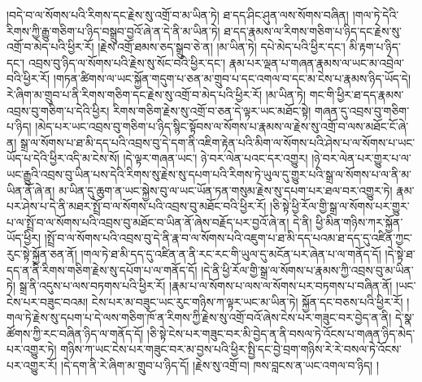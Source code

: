 །བདེ་བ་ལ་སོགས་པའི་རིགས་དང་རྗེས་སུ་འགྲོ་བ་མ་ཡིན་ཏེ། ཐ་དད་ཤིང་ཤུན་ལས་སོགས་བཞིན། །གལ་ཏེ་དེའི་རིགས་ཀྱི་རྒྱུ་གཅིག་པ་ཉིད་བསྒྲུབ་བྱའོ་ཞེ་ན་དེ་ནི་མ་ཡིན་ཏེ། ཐ་དད་རྣམས་ལ་རིགས་གཅིག་པ་ཉིད་དང་རྗེས་སུ་འགྲོ་བ་མེད་པའི་ཕྱིར་རོ། །རྗེས་འགྲོ་ཐམས་ཅད་སྒྲུབ་ཅེ་ན། །མ་ཡིན་ཏེ། དཔེ་མེད་པའི་ཕྱིར་དང་། མི་རྟག་པ་ཉིད་དང་། འབྲས་བུ་ཉིད་ལ་སོགས་པའི་རྗེས་སུ་སོང་བའི་ཕྱིར་དང་། རྣམ་པར་ལྡན་པ་གཞན་རྣམས་ལ་ཡང་མ་འབྲེལ་བའི་ཕྱིར་རོ། །གཏན་ཚིགས་ལ་ཡང་སྐྱོན་གདུག་པ་ཅན་མ་གྲུབ་པ་དང་འགལ་བ་དང་མ་ངེས་པ་རྣམས་ཉིད་ཡོད་དེ། རེ་ཞིག་མ་གྲུབ་པ་ནི་རིགས་གཅིག་དང་རྗེས་སུ་འགྲོ་བ་མེད་པའི་ཕྱིར་རོ། །མ་ཡིན་ཏེ། གང་གི་ཕྱིར་ཐ་དད་རྣམས་འབྲས་བུ་གཅིག་པ་དེའི་ཕྱིར། རིགས་གཅིག་རྗེས་སུ་འགྲོ་བ་ཅན་དེ་ལྟར་ཡང་མཐོང་སྟེ། གཞན་དུ་འབྲས་བུ་གཅིག་པ་ཉིད། །མེད་པར་ཡང་འབྲས་བུ་གཅིག་པ་ཉིད་སྙིང་སྟོབས་ལ་སོགས་པ་རྣམས་ལ་རྗེས་སུ་འགྲོ་བ་ལས་མཐོང་ངོ་ཞེ་ན། སྒྲ་ལ་སོགས་པ་ཐ་མི་དད་པའི་འབྲས་བུ་དེ་དག་ནི་འཇིག་རྟེན་པའི་མིག་ལ་སོགས་པའི་ཤེས་པ་ལ་སོགས་པ་ཡང་ཡོད་པ་དེའི་ཕྱིར་འདི་མ་ངེས་སོ། །དེ་ལྟར་གཞན་ཡང་། ཉེ་བར་ལེན་པའང་དར་འགྱུར། །ཉེ་བར་ལེན་པར་གྱུར་པ་ལ་ཡང་རྒྱུའི་འབྲས་བུ་ཡིན་པས་དེའི་རིགས་སུ་རྗེས་སུ་དཔག་པའི་རིགས་ཏེ་ཡུལ་དུ་གྱུར་པའི་སྒྲ་ལ་སོགས་པ་ལ་ནི་མ་ཡིན་ནོ་ཞེ་ན། མ་ཡིན་དུ་ཆུག་ན་ཡང་སྐྱེས་བུ་ལ་ཡང་ཡོན་ཏན་གསུམ་རྗེས་སུ་དཔག་པར་ཐལ་བར་འགྱུར་ཏེ། རྣམ་པར་ཤེས་པ་དེ་ནི་མཐར་སྤྲོ་བ་ལ་སོགས་པའི་འབྲས་བུ་མཐོང་བའི་ཕྱིར་རོ། །ཅི་སྟེ་ཕྱི་རོལ་གྱི་སྒྲ་ལ་སོགས་པར་གྱུར་པ་ལ་སྤྲོ་བ་ལ་སོགས་པའི་འབྲས་བུ་མཐོང་བ་ཡིན་ནོ་ཞེས་བརྗོད་པར་བྱའོ་ཞེ་ན། དེ་ནི། ཕྱི་མིན་གཉིས་ཀར་སྐྱོན་ཡོད་ཕྱིར། །སྤྲོ་བ་ལ་སོགས་པའི་འབྲས་བུ་དེ་ནི་རྣ་བ་ལ་སོགས་པའི་འཇུག་པ་ཐ་མི་དད་པའམ་ཐ་དད་དུ་འཛིན་ཀྱང་རུང་སྟེ་སྐྱོན་ཅན་ནོ། །གལ་ཏེ་ཐ་མི་དད་དུ་འཛིན་ན་ནི་རང་རང་གི་ཡུལ་དུ་མངོན་པར་ཞེན་པ་ལ་གནོད་དོ། །དེ་སྟེ་ཐ་དད་ན་ནི་རིགས་གཅིག་རྗེས་སུ་དཔོག་པ་ལ་གནོད་དོ། །དེ་ནི་ཕྱི་རོལ་གྱི་སྒྲ་ལ་སོགས་པ་རྣམས་ཀྱི་འབྲས་བུ་མ་ཡིན་ཏེ། སྒྲ་ནི་འདུས་པ་ལས་བཏགས་པའི་ཕྱིར་རོ། །རྣམ་པ་ལ་སོགས་པ་ལས་ལ་སོགས་པར་བཏགས་པ་བཞིན་ནོ། །ཡང་ངེས་པར་བཟུང་བའམ། ངེས་པར་མ་བཟུང་ཡང་རུང་གཉིས་ཀ་ལྟར་ཡང་མ་ཡིན་ཏེ། སྐྱོན་དང་བཅས་པའི་ཕྱིར་རོ། །གལ་ཏེ་རྗེས་སུ་དཔག་པ་དེ་ལས་གཅིག་ཁོ་ན་རིགས་ཀྱི་རྗེས་སུ་འགྲོ་བའོ་ཞེས་ངེས་པར་གཟུང་བར་བྱེད་ན་ནི། དེ་སྣ་ཚོགས་ཀྱི་རང་བཞིན་ཉིད་ལ་གནོད་དོ། །ཅི་སྟེ་ངེས་པར་གཟུང་བར་མི་བྱེད་ན་ནི་བསལ་ཏེ་འོངས་པ་གཞན་ཉིད་མེད་པར་འགྱུར་ཏེ། གཉིས་ཀ་ཡང་ངེས་པར་གཟུང་བར་མ་བྱས་པའི་ཕྱིར་སྤྱི་དང་བྱེ་བྲག་གཉིས་རེ་རེ་བསལ་ཏེ་འོངས་པར་འགྱུར་རོ། །དེ་དག་ནི་རེ་ཞིག་མ་གྲུབ་པ་ཉིད་དོ། །རྗེས་སུ་འགྲོ་བ། ཁས་བླངས་ན་ཡང་འགལ་བ་ཉིད། །
